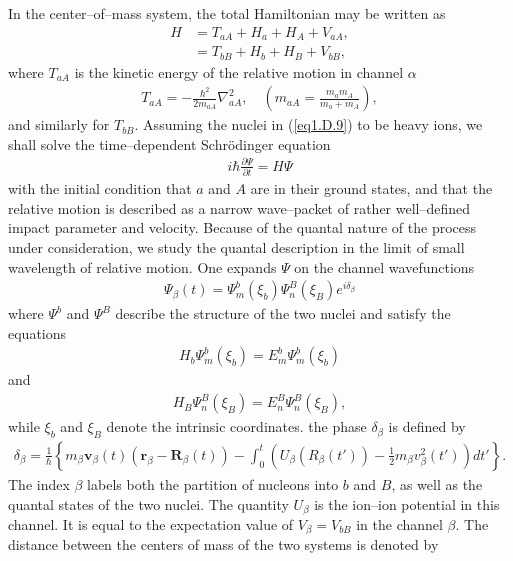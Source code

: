 \begin{subappendices}
In the center--of--mass system, the total Hamiltonian may be written as 
\begin{align}\label{eq1.D.10}
\nonumber H&=T_{aA}+H_a+H_A+V_{aA},\\
&=T_{bB}+H_b+H_B+V_{bB},
\end{align}
where $T_{aA}$ is the kinetic energy of the relative motion in channel $\alpha$
\begin{align}\label{eq1.D.11}
T_{aA}=-\frac{\hbar^2}{2m_{aA}}\nabla^2_{aA},\quad (m_{aA}=\frac{m_am_A}{m_a+m_A}),
\end{align}
and similarly for $T_{bB}$. Assuming the nuclei in (\ref{eq1.D.9}) to be heavy ions, we shall solve the time--dependent Schr\"odinger equation
\begin{align}\label{eq1.D.12}
i\hbar\frac{\partial\Psi}{\partial t}=H\Psi
\end{align}
with the initial condition that $a$ and $A$ are in their ground states, and that the relative motion is described as a narrow wave--packet of rather well--defined impact parameter and velocity. Because of the quantal nature of the process under consideration, we study the quantal description in the limit of small wavelength of relative motion. One expands $\Psi$ on the channel wavefunctions
\begin{align}\label{eq1.D.13}
\Psi_\beta(t)=\Psi_m^b(\xi_b)\Psi_n^B(\xi_B)e^{i\delta_\beta}
\end{align}
where $\Psi^b$ and $\Psi^B$ describe the structure of the two nuclei and satisfy the equations 
\begin{align}\label{eq1.D.14}
H_b\Psi_m^b(\xi_b)=E_m^b\Psi_m^b(\xi_b)
\end{align}
and
\begin{align}\label{eq1.D.15}
H_B\Psi_n^B(\xi_B)=E_n^B\Psi_n^B(\xi_B),
\end{align}
while $\xi_b$ and $\xi_B$ denote the intrinsic coordinates. the phase $\delta_\beta$ is defined by
\begin{align}\label{eq1.D.16}
\delta_\beta=\frac{1}{\hbar}\left\{m_\beta\mathbf v_\beta(t)(\mathbf r_\beta-\mathbf R_\beta(t))-\int_0^t\left(U_\beta(R_\beta(t'))-\frac{1}{2}m_\beta v^2_\beta(t')\right)dt'\right\}.
\end{align}
The index $\beta$ labels both the partition of nucleons into $b$ and $B$, as well as the quantal states of the two nuclei. The quantity $U_\beta$ is the ion--ion potential in this channel. It is equal to the expectation value of $V_\beta=V_{bB}$ in the channel $\beta$. The distance between the centers of mass of the two systems is denoted by

\end{subappendices}
